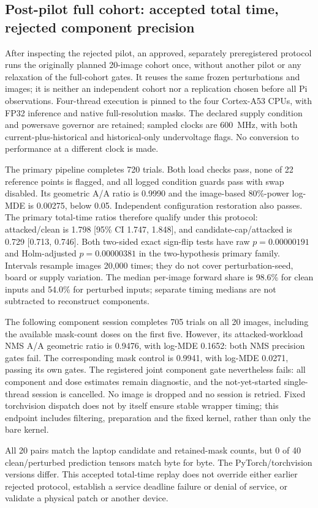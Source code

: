 \subsection{Post-pilot full cohort: accepted total time, rejected component precision}
\label{app:seg-pi3b-full20}
After inspecting the rejected pilot, an approved, separately preregistered
protocol runs the originally planned 20-image cohort once, without another
pilot or any relaxation of the full-cohort gates. It reuses the same frozen
perturbations and images; it is neither an independent cohort nor a replication
chosen before all Pi observations. Four-thread execution is pinned to the four
Cortex-A53 CPUs, with FP32 inference and native full-resolution masks. The
declared supply condition and powersave governor are retained; sampled clocks
are 600~MHz, with both current-plus-historical and historical-only undervoltage
flags. No conversion to performance at a different clock is made.

The primary pipeline completes 720 trials. Both load checks pass,
none of 22 reference points is flagged, and all logged condition guards
pass with swap disabled. Its geometric A/A ratio is
0.9990 and the image-based 80\%-power log-MDE is
0.00275, below 0.05. Independent configuration restoration also
passes. The primary total-time ratios therefore qualify under this protocol:
attacked/clean is 1.798 [95\% CI
1.747, 1.848], and candidate-cap/attacked is
0.729 [0.713, 0.746].
Both two-sided exact sign-flip tests have raw $p=0.00000191$ and
Holm-adjusted $p=0.00000381$ in the two-hypothesis primary family.
Intervals resample images 20,000 times; they do not cover perturbation-seed,
board or supply variation. The median per-image forward share is
98.6\% for clean inputs and
54.0\% for perturbed inputs; separate timing medians
are not subtracted to reconstruct components.

The following component session completes 705 trials on all
20 images, including the available mask-count doses on the first five.
However, its attacked-workload NMS A/A geometric ratio is
0.9476, with log-MDE
0.1652: both NMS precision gates fail.
The corresponding mask control is 0.9941, with log-MDE
0.0271, passing its own gates. The registered
joint component gate nevertheless fails: all component and dose estimates
remain diagnostic, and the not-yet-started single-thread session is cancelled.
No image is dropped and no session is retried. Fixed torchvision dispatch does
not by itself ensure stable wrapper timing; this endpoint includes filtering,
preparation and the fixed kernel, rather than only the bare kernel.

All 20 pairs match the laptop candidate and retained-mask counts, but
0 of 40 clean/perturbed prediction tensors match byte for byte.
The PyTorch/torchvision versions differ. This accepted total-time replay does
not override either earlier rejected protocol, establish a service deadline
failure or denial of service, or validate a physical patch or another device.
